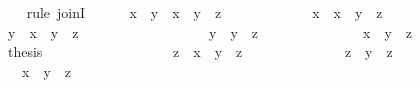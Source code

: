 \begin{isabellebody}
\ \ \isamarkupfalse%
\ {\isacharparenleft}rule\ joinI{\isacharparenright}\isanewline
\ \ \ \ \isamarkupfalse%
\ {\isachardoublequoteopen}x\ {\isasymsqunion}\ y\ {\isasymsqsubseteq}\ x\ {\isasymsqunion}\ {\isacharparenleft}y\ {\isasymsqunion}\ z{\isacharparenright}{\isachardoublequoteclose}\isanewline
\ \ \ \ \isamarkupfalse%
\isanewline
\ \ \ \ \ \ \isamarkupfalse%
\ {\isachardoublequoteopen}x\ {\isasymsqsubseteq}\ x\ {\isasymsqunion}\ {\isacharparenleft}y\ {\isasymsqunion}\ z{\isacharparenright}{\isachardoublequoteclose}\ \isacommand{{\isachardot}{\isachardot}}\isamarkupfalse%
\isanewline
\ \ \ \ \ \ \isamarkupfalse%
\ {\isachardoublequoteopen}y\ {\isasymsqsubseteq}\ x\ {\isasymsqunion}\ {\isacharparenleft}y\ {\isasymsqunion}\ z{\isacharparenright}{\isachardoublequoteclose}\isanewline
\ \ \ \ \ \ \isamarkupfalse%
\ {\isacharminus}\isanewline
\ \ \ \ \ \ \ \ \isamarkupfalse%
\ {\isachardoublequoteopen}y\ {\isasymsqsubseteq}\ y\ {\isasymsqunion}\ z{\isachardoublequoteclose}\ \isacommand{{\isachardot}{\isachardot}}\isamarkupfalse%
\isanewline
\ \ \ \ \ \ \ \ \isamarkupfalse%
\ \isamarkupfalse%
\ {\isachardoublequoteopen}{\isachardot}{\isachardot}{\isachardot}\ {\isasymsqsubseteq}\ x\ {\isasymsqunion}\ {\isacharparenleft}y\ {\isasymsqunion}\ z{\isacharparenright}{\isachardoublequoteclose}\ \isacommand{{\isachardot}{\isachardot}}\isamarkupfalse%
\isanewline
\ \ \ \ \ \ \ \ \isamarkupfalse%
\ \isamarkupfalse%
\ {\isacharquery}thesis\ \isacommand{{\isachardot}}\isamarkupfalse%
\isanewline
\ \ \ \ \ \ \isamarkupfalse%
\isanewline
\ \ \ \ \isamarkupfalse%
\isanewline
\ \ \ \ \isamarkupfalse%
\ {\isachardoublequoteopen}z\ {\isasymsqsubseteq}\ x\ {\isasymsqunion}\ {\isacharparenleft}y\ {\isasymsqunion}\ z{\isacharparenright}{\isachardoublequoteclose}\isanewline
\ \ \ \ \isamarkupfalse%
\ {\isacharminus}\isanewline
\ \ \ \ \ \ \isamarkupfalse%
\ {\isachardoublequoteopen}z\ {\isasymsqsubseteq}\ y\ {\isasymsqunion}\ z{\isachardoublequoteclose}\ \ \isacommand{{\isachardot}{\isachardot}}\isamarkupfalse%
\isanewline
\ \ \ \ \ \ \isamarkupfalse%
\ \isamarkupfalse%
\ {\isachardoublequoteopen}{\isachardot}{\isachardot}{\isachardot}\ {\isasymsqsubseteq}\ x\ {\isasymsqunion}\ {\isacharparenleft}y\ {\isasymsqunion}\ z{\isacharparenright}{\isachardoublequoteclose}\ \isacommand{{\isachardot}{\isachardot}}\isamarkupfalse%

\end{isabellebody}
